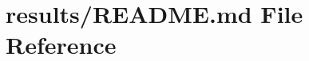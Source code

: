 \hypertarget{results_2README_8md}{}\section{results/\+R\+E\+A\+D\+ME.md File Reference}
\label{results_2README_8md}
